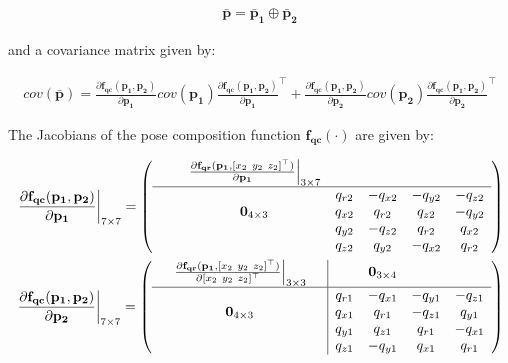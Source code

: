 \documentclass[a4paper,10pt]{report}
\begin{document}
\begin{eqnarray}
\mathbf{\bar{p}} = \mathbf{\bar{p}_1} \oplus \mathbf{\bar{p}_2}
\end{eqnarray}

\noindent and a covariance matrix given by:

\begin{eqnarray}
cov(\mathbf{\bar{p}}) = 
\frac{\partial \mathbf{f_{qc}}(\mathbf{p_1},\mathbf{p_2}) }{\partial \mathbf{p_1}}
cov(\mathbf{p_1})
\frac{\partial \mathbf{f_{qc}}(\mathbf{p_1},\mathbf{p_2}) }{\partial \mathbf{p_1}}^\top
+
\frac{\partial \mathbf{f_{qc}}(\mathbf{p_1},\mathbf{p_2}) }{\partial \mathbf{p_2}}
cov(\mathbf{p_2})
\frac{\partial \mathbf{f_{qc}}(\mathbf{p_1},\mathbf{p_2}) }{\partial \mathbf{p_2}}^\top
\end{eqnarray}

The Jacobians of the pose composition function $\mathbf{f_{qc}}(\cdot)$ are given by:


\begin{eqnarray}
\left. 
\frac{\partial \mathbf{f_{qc}}(\mathbf{p_1},\mathbf{p_2}) }{\partial \mathbf{p_1}} 
\right|_{7 \times 7} 
= 
\left(
  \begin{array}{ccccccc}
     & & \left. \frac{\partial \mathbf{f_{qr}} (\mathbf{p_1}, [ x_2 ~ y_2 ~ z_2]^\top ) }{\partial \mathbf{p_1}} \right|_{3\times 7}   & &  \\ \hline
    &  &  			& q_{r2} &-q_{x2} &-q_{y2} &-q_{z2}  \\
    & & \mathbf{0}_{4\times 3}  	& q_{x2} & q_{r2} & q_{z2} &-q_{y2}  \\
    & &  			& q_{y2} &-q_{z2} & q_{r2} & q_{x2}  \\
    & &  			& q_{z2} & q_{y2} &-q_{x2} & q_{r2}   
  \end{array}
\right) 
\\
\left. 
\frac{\partial \mathbf{f_{qc}}(\mathbf{p_1},\mathbf{p_2}) }{\partial \mathbf{p_2}} 
\right|_{7 \times 7} 
= 
\left(
  \begin{array}{ccc|cccc}
     & \left. 
	\frac{\partial \mathbf{f_{qr}} (\mathbf{p_1}, [ x_2 ~ y_2 ~ z_2]^\top ) }{\partial [ x_2 ~ y_2 ~ z_2]^\top} \right|_{3\times 3} 
      &  & & \mathbf{0}_{3 \times 4}  \\ \hline
   & & 				& q_{r1} &-q_{x1} &-q_{y1} &-q_{z1}  \\
   & \mathbf{0}_{4\times 3} &	& q_{x1} & q_{r1} &-q_{z1} & q_{y1}  \\
   & & 				& q_{y1} & q_{z1} & q_{r1} &-q_{x1}  \\
   & & 				& q_{z1} &-q_{y1} & q_{x1} & q_{r1}   
  \end{array}
\right) 
\\
\end{eqnarray}
\end{document}

